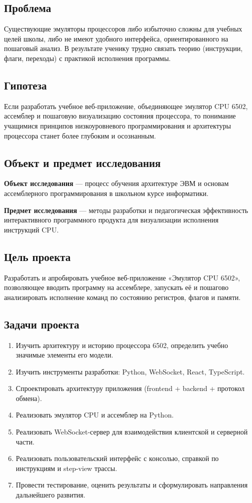 \documentclass[12pt,a4paper]{article}
\begin{document}
\subsection{Проблема}
Существующие эмуляторы процессоров либо избыточно сложны для учебных целей школы, либо не имеют удобного интерфейса, ориентированного на пошаговый анализ. В результате ученику трудно связать теорию (инструкции, флаги, переходы) с практикой исполнения программы.

\subsection{Гипотеза}
Если разработать учебное веб-приложение, объединяющее эмулятор CPU 6502, ассемблер и пошаговую визуализацию состояния процессора, то понимание учащимися принципов низкоуровневого программирования и архитектуры процессора станет более глубоким и осознанным.

\subsection{Объект и предмет исследования}
\textbf{Объект исследования} --- процесс обучения архитектуре ЭВМ и основам ассемблерного программирования в школьном курсе информатики.

\textbf{Предмет исследования} --- методы разработки и педагогическая эффективность интерактивного программного продукта для визуализации исполнения инструкций CPU.

\subsection{Цель проекта}
Разработать и апробировать учебное веб-приложение «Эмулятор CPU 6502», позволяющее вводить программу на ассемблере, запускать её и пошагово анализировать исполнение команд по состоянию регистров, флагов и памяти.

\subsection{Задачи проекта}
\begin{enumerate}
  \item Изучить архитектуру и историю процессора 6502, определить учебно значимые элементы его модели.
  \item Изучить инструменты разработки: Python, WebSocket, React, TypeScript.
  \item Спроектировать архитектуру приложения (frontend + backend + протокол обмена).
  \item Реализовать эмулятор CPU и ассемблер на Python.
  \item Реализовать WebSocket-сервер для взаимодействия клиентской и серверной части.
  \item Реализовать пользовательский интерфейс с консолью, справкой по инструкциям и step-view трассы.
  \item Провести тестирование, оценить результаты и сформулировать направления дальнейшего развития.
\end{enumerate}
\end{document}
